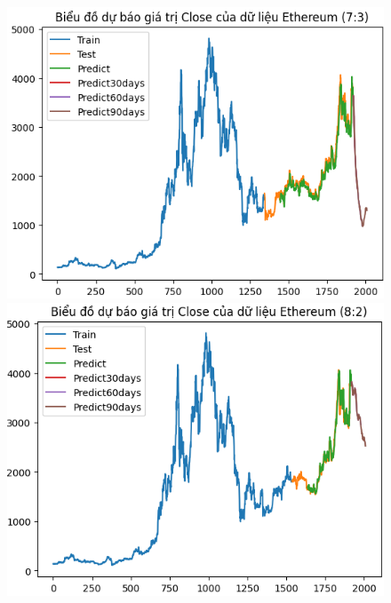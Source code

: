 \documentclass[conference]{IEEEtran}
\begin{document}
\begin{figure}[H]
    \centering
    \begin{minipage}{0.15\textwidth}
    \centering
    \includegraphics[width=1\textwidth]{Figure/ETH73.png}
    \end{minipage}
    \hfill
    \begin{minipage}{0.15\textwidth}
    \centering
    \includegraphics[width=1\textwidth]{Figure/ETH82.png}
    \end{minipage}
    \hfill
    \begin{minipage}{0.15\textwidth}
    \centering

\end{minipage}
\end{figure}
\end{document}
